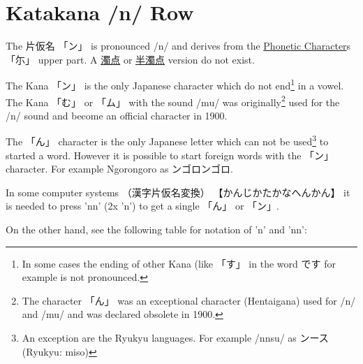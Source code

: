 \section{Katakana /n/ Row}\label{sec:KatakanaNrow}


 The  片仮名 {「ン」} is pronounced  /n/ and  derives from the
\hyperref[sec:PhoneticCharacter]{Phonetic Character}s {「尓」} upper part.  A
\hyperref[sec:Dakuten]{濁点} or \hyperref[sec:Handakuten]{半濁点} version do
not exist.


The Kana {「ン」}  is the only Japanese character which do not end\footnote{ In
some cases the ending of other Kana (like {「す」} in the word {です} for
example is not pronounced.} in a vowel. The Kana {「む」} or {「ム」} with the
sound /mu/ was originally\footnote{ The character {「ん」} was an exceptional
character (Hentaigana) used for /n/ and /mu/ and was declared obsolete in 1900.}
used for the /n/ sound and become an official character in 1900.

The {「ん」} character is the only Japanese letter which can not be
used\footnote{An exception are the Ryukyu languages. For example /nnsu/ as
ンース (Ryukyu: miso) } to started a word. However it is possible to start
foreign words with the {「ン」} character. For example Ngorongoro as
ンゴロンゴロ.

In some computer systems {（漢字片仮名変換）} {【かんじかたかなへんかん】} it
is needed to press 'nn' (2x 'n') to get a single {「ん」} or {「ン」}.

On the other hand, see the following table for notation of 'n' and 'nn':
\bigskip






